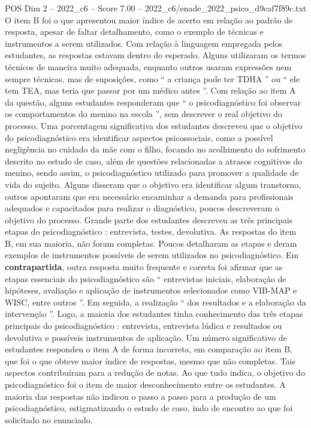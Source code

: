 \begin{textsample}{POS Dim 2 – 2022\_c6 – Score 7.00 – 2022\_c6/enade\_2022\_psico\_d9caf7f89c.txt}
O item B foi o que apresentou maior índice de acerto em relação ao padrão de resposta, apesar de faltar detalhamento, como o exemplo de técnicas e instrumentos a serem utilizados.
Com relação à linguagem empregada pelos estudantes, as respostas estavam dentro do esperado.
Alguns utilizaram os termos técnicos de maneira muito adequada, enquanto outros usaram expressões nem sempre técnicas, mas de suposições, como “ a criança pode ter TDHA ” ou “ ele tem TEA, mas teria que passar por um médico antes ”.
Com relação ao item A da questão, alguns estudantes responderam que “ o psicodiagnóstico foi observar os comportamentos do menino na escola ”, sem descrever o real objetivo do processo.
Uma porcentagem significativa dos estudantes descreveu que o objetivo do psicodiagnóstico era identificar aspectos psicossociais, como a possível negligência no cuidado da mãe com o filho, focando no acolhimento do sofrimento descrito no estudo de caso, além de questões relacionadas a atrasos cognitivos do menino, sendo assim, o psicodiagnóstico utilizado para promover a qualidade de vida do sujeito.
Alguns disseram que o objetivo era identificar algum transtorno, outros apontaram que era necessário encaminhar a demanda para profissionais adequados e capacitados para realizar o diagnóstico, poucos descreveram o objetivo do processo.
Grande parte dos estudantes descreveu as três principais etapas do psicodiagnóstico : entrevista, testes, devolutiva.
As respostas do item B, em sua maioria, não foram completas.
Poucos detalharam as etapas e deram exemplos de instrumentos possíveis de serem utilizados no psicodiagnóstico.
Em \textbf{contrapartida}, outra resposta muito frequente e correta foi afirmar que as etapas essenciais do psicodiagnóstico são “ entrevistas iniciais, elaboração de hipóteses, avaliação e aplicação de instrumentos selecionados como VIB-MAP e WISC, entre outros ”.
Em seguida, a realização “ dos resultados e a elaboração da intervenção ”.
Logo, a maioria dos estudantes tinha conhecimento das três etapas principais do psicodiagnóstico : entrevista, entrevista lúdica e resultados ou devolutiva e possíveis instrumentos de aplicação.
Um número significativo de estudantes respondeu o item A de forma incorreta, em comparação ao item B, que foi o que obteve maior índice de respostas, mesmo que não completas.
Tais aspectos contribuíram para a redução de notas.
Ao que tudo indica, o objetivo do psicodiagnóstico foi o item de maior desconhecimento entre os estudantes.
A maioria das respostas não indicou o passo a passo para a produção de um psicodiagnóstico, estigmatizando o estudo de caso, indo de encontro ao que foi solicitado no enunciado.

\end{textsample}
